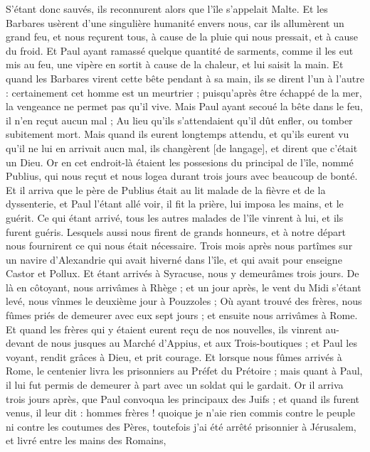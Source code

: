 \begin{multicols}{2}
\VerseOne{}S'étant donc sauvés, ils reconnurent alors que l'île s'appelait Malte.
Et les Barbares usèrent d'une singulière humanité envers nous, car ils allumèrent un grand feu, et nous reçurent tous, à cause de la pluie qui nous pressait, et à cause du froid.
Et Paul ayant ramassé quelque quantité de sarments, comme il les eut mis au feu, une vipère en sortit à cause de la chaleur, et lui saisit la main.
Et quand les Barbares virent cette bête pendant à sa main, ils se dirent l'un à l'autre : certainement cet homme est un meurtrier ; puisqu'après être échappé de la mer, la vengeance ne permet pas qu'il vive.
Mais Paul ayant secoué la bête dans le feu, il n'en reçut aucun mal ;
Au lieu qu'ils s'attendaient qu'il dût enfler, ou tomber subitement mort. Mais quand ils eurent longtemps attendu, et qu'ils eurent vu qu'il ne lui en arrivait aucn mal, ils changèrent [de langage], et dirent que c'était un Dieu.
Or en cet endroit-là étaient les possesions du principal de l'île, nommé Publius, qui nous reçut et nous logea durant trois jours avec beaucoup de bonté.
Et il arriva que le père de Publius était au lit malade de la fièvre et de la dyssenterie, et Paul l'étant allé voir, il fit la prière, lui imposa les mains, et le guérit.
Ce qui étant arrivé, tous les autres malades de l'île vinrent à lui, et ils furent guéris.
Lesquels aussi nous firent de grands honneurs, et à notre départ nous fournirent ce qui nous était nécessaire.
Trois mois après nous partîmes sur un navire d'Alexandrie qui avait hiverné dans l'île, et qui avait pour enseigne Castor et Pollux.
Et étant arrivés à Syracuse, nous y demeurâmes trois jours.
De là en côtoyant, nous arrivâmes à Rhège ; et un jour après, le vent du Midi s'étant levé, nous vînmes le deuxième jour à Pouzzoles ;
Où ayant trouvé des frères, nous fûmes priés de demeurer avec eux sept jours ; et ensuite nous arrivâmes à Rome.
Et quand les frères qui y étaient eurent reçu de nos nouvelles, ils vinrent au-devant de nous jusques au Marché d'Appius, et aux Trois-boutiques ; et Paul les voyant, rendit grâces à Dieu, et prit courage.
Et lorsque nous fûmes arrivés à Rome, le centenier livra les prisonniers au Préfet du Prétoire ; mais quant à Paul, il lui fut permis de demeurer à part avec un soldat qui le gardait.
Or il arriva trois jours après, que Paul convoqua les principaux des Juifs ; et quand ils furent venus, il leur dit : hommes frères ! quoique je n'aie rien commis contre le peuple ni contre les coutumes des Pères, toutefois j'ai été arrêté prisonnier à Jérusalem, et livré entre les mains des Romains,

\end{multicols}
